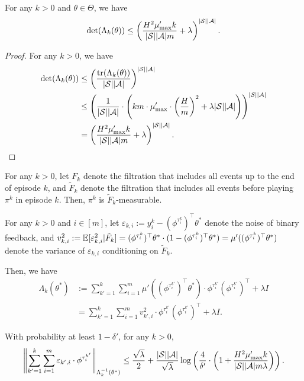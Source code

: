 \begin{lemma} \label{lemma:Lambda_k}
	For any $k>0$ and $\theta \in \Theta$, we have
	\begin{align*}
		\det(\Lambda_k(\theta)) \leq \left(  \frac{H^2 \mu'_{\max} k}{|\mathcal{S}||\mathcal{A}| m} + \lambda   \right)^{|\mathcal{S}||\mathcal{A}|} .
	\end{align*}
\end{lemma}
\begin{proof}
	For any $k>0$, we have
	\begin{align*}
		\det(\Lambda_k(\theta)) &\leq \left(  \frac{\textup{tr}(\Lambda_k(\theta))}{|\mathcal{S}||\mathcal{A}|}  \right)^{|\mathcal{S}||\mathcal{A}|}
		\\
		&\leq \left(  \frac{1}{|\mathcal{S}||\mathcal{A}|} \cdot \left(  k m \cdot \mu'_{\max} \cdot \left( \frac{H}{m} \right)^2 + \lambda |\mathcal{S}||\mathcal{A}|  \right)  \right)^{|\mathcal{S}||\mathcal{A}|}
		\\
		&= \left(  \frac{H^2 \mu'_{\max} k}{|\mathcal{S}||\mathcal{A}| m} + \lambda   \right)^{|\mathcal{S}||\mathcal{A}|} .
	\end{align*}
\end{proof}

For any $k>0$, let $F_k$ denote the filtration that includes all events up to the end of episode $k$, and $\tilde{F}_{k}$ denote the filtration that includes all events before playing $\pi^k$ in episode $k$. Then, $\pi^k$ is $\tilde{F}_{k}$-measurable.

For any $k>0$ and $i \in [m]$, let $\varepsilon_{k,i}:=y^k_i-(\phi^{\tau^k_i})^\top \theta^*$ denote the noise of binary feedback, and $v_{k,i}^2:=\mathbb{E}[\varepsilon_{k,i}^2 | \tilde{F}_{k}]=(\phi^{\tau^k_i})^\top \theta^* \cdot (1- (\phi^{\tau^k_i})^\top \theta^*)=\mu'((\phi^{\tau^k_i})^\top \theta^*)$ denote the variance of $\varepsilon_{k,i}$ conditioning on $\tilde{F}_{k}$.

Then, we have
\begin{align*}
	\Lambda_{k}(\theta^*) &:= \sum_{k'=1}^{k} \sum_{i=1}^{m} \mu'( (\phi^{\tau^{k'}_i})^\top \theta^* ) \cdot \phi^{\tau^{k'}_i} (\phi^{\tau^{k'}_i})^\top + \lambda I 
	\\
	&= \sum_{k'=1}^{k} \sum_{i=1}^{m} v_{k',i}^2 \cdot \phi^{\tau^{k'}_i} (\phi^{\tau^{k'}_i})^\top + \lambda I .
\end{align*}


\begin{lemma}\label{lemma:noise_seq_martingale}
	With probability at least $1-\delta'$, for any $k>0$,
	\begin{align*}
		\left\| \sum_{k'=1}^{k} \sum_{i=1}^{m} \varepsilon_{k',i} \cdot \phi^{\tau^{k'}_i} \right\|_{\Lambda_{k}^{-1}(\theta^*)} \leq \frac{\sqrt{\lambda}}{2} + \frac{|\mathcal{S}||\mathcal{A}|}{\sqrt{\lambda}} \log \left(  \frac{4}{\delta'} \cdot \left(  1 + \frac{H^2 \mu'_{\max} k}{|\mathcal{S}||\mathcal{A}| m \lambda}    \right)   \right) .
	\end{align*}
\end{lemma}

